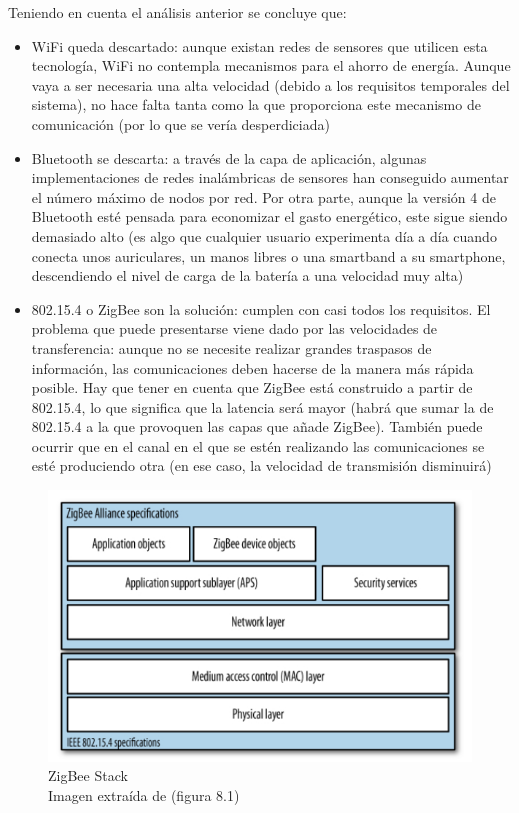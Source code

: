 Teniendo en cuenta el análisis anterior se concluye que:
\begin{itemize}
  \item WiFi queda descartado: aunque existan redes de sensores que utilicen esta tecnología,
  WiFi no contempla mecanismos para el ahorro de energía. Aunque vaya a ser necesaria una alta velocidad
  (debido a los requisitos temporales del sistema), no hace falta tanta como la que
  proporciona este mecanismo de comunicación (por lo que se vería desperdiciada)
  \item Bluetooth se descarta: a través de la capa de aplicación, algunas implementaciones
  de redes inalámbricas de sensores han conseguido aumentar el número máximo de nodos por red.
  Por otra parte, aunque la versión 4 de Bluetooth esté pensada para economizar el gasto energético,
  este sigue siendo demasiado alto (es algo que cualquier usuario experimenta día a día cuando
  conecta unos auriculares, un manos libres o una smartband a su smartphone, descendiendo el nivel de
  carga de la batería a una velocidad muy alta)
  \item 802.15.4 o ZigBee son la solución: cumplen con casi todos los requisitos.
  El problema que puede presentarse viene dado por las velocidades de transferencia: aunque no
  se necesite realizar grandes traspasos de información, las comunicaciones deben
  hacerse de la manera más rápida posible. Hay que tener en cuenta que ZigBee está construido a partir
  de 802.15.4, lo que significa que la latencia será mayor (habrá que sumar la de 802.15.4 a la que provoquen
  las capas que añade ZigBee). También puede ocurrir que en el canal en el que se estén realizando las comunicaciones
  se esté produciendo otra (en ese caso, la velocidad de transmisión disminuirá)
\end{itemize}

\begin{figure}[htb]
\centering
\captionsetup{justification=centering}
\includegraphics[width=1\textwidth]{./imagenes/zigbeestack}
\caption{ZigBee Stack \\
\scriptsize{Imagen extraída de \cite{faludi} (figura 8.1)} } \label{fig:stackzigbee}
\end{figure}

